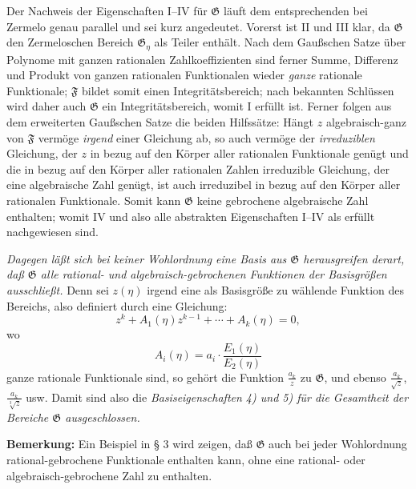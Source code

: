 Der Nachweis der Eigenschaften I--IV für $\mathfrak G$ läuft dem entsprechenden
bei Zermelo genau parallel und sei kurz angedeutet. Vorerst ist II und III klar,
da $\mathfrak G$ den Zermeloschen Bereich $\mathfrak G_\eta$ als Teiler
enthält. Nach dem Gaußschen Satze über Polynome mit ganzen rationalen
Zahlkoeffizienten sind ferner Summe, Differenz und Produkt von ganzen rationalen
Funktionalen wieder \emph{ganze} rationale Funktionale; $\mathfrak F$ bildet
somit einen Integritätsbereich; nach bekannten Schlüssen wird daher auch $\mathfrak G$ ein Integritätsbereich, womit I
erfüllt ist. Ferner folgen aus dem erweiterten Gaußschen Satze die beiden Hilfssätze: \glqq{}Hängt $z$ algebraisch-ganz von $\mathfrak F$
vermöge \emph{irgend} einer Gleichung ab, so auch vermöge der
\emph{irreduziblen} Gleichung, der $z$ in bezug auf den Körper aller rationalen
Funktionale genügt\grqq{} und \glqq{}die in bezug auf den
Körper aller rationalen Zahlen irreduzible Gleichung, der eine algebraische Zahl
genügt, ist auch irreduzibel in bezug auf den Körper aller rationalen
Funktionale.\grqq{} Somit kann $\mathfrak G$ keine gebrochene algebraische Zahl
enthalten; womit IV und also alle abstrakten Eigenschaften I--IV als erfüllt
nachgewiesen sind.

\emph{Dagegen läßt sich bei keiner Wohlordnung eine Basis aus $\mathfrak G$
herausgreifen derart, daß $\mathfrak G$ alle rational- und
algebraisch-gebrochenen Funktionen der Basisgrößen ausschließt.} Denn sei
$z(\eta)$ irgend eine als Basisgröße zu wählende Funktion des Bereichs, also
definiert durch eine Gleichung:
\[
 z^k+A_1(\eta)z^{k-1}+\cdots+A_k(\eta)=0,
\]
wo
\[
 A_i(\eta)=a_i\cdot\frac{E_1(\eta)}{E_2(\eta)}
\]
ganze rationale Funktionale sind, so gehört die Funktion
$\frac{a_k}{z}$ zu $\mathfrak G$, und ebenso
$\frac{a_k}{\sqrt z}$, $\frac{a_k}{\sqrt[3]z}$ usw. Damit sind also
die \emph{Basiseigenschaften 4) und 5) für die Gesamtheit der Bereiche
$\mathfrak G$ ausgeschlossen.}

\textbf{Bemerkung:} Ein Beispiel in § 3 wird zeigen, daß $\mathfrak G$ auch bei
jeder Wohlordnung rational-gebrochene Funktionale enthalten kann, ohne eine
rational- oder algebraisch-gebrochene Zahl zu enthalten.

